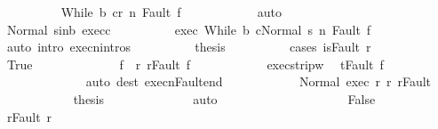 \begin{isabellebody}
\isanewline
\ \ \ \ \ \ \ \ \isamarkupfalse%
\ {\isachardoublequoteopen}{\isasymGamma}{\isasymturnstile}{\isasymlangle}While\ b\ c{\isacharcomma}r{\isacharprime}{\isasymrangle}\ {\isacharequal}n{\isasymRightarrow}\ Fault\ f{\isacharprime}{\isachardoublequoteclose}\isanewline
\ \ \ \ \ \ \ \ \ \ \isamarkupfalse%
\ auto\ \isanewline
\ \ \ \ \ \ \ \ \isamarkupfalse%
\ Normal\ s{\isacharprime}{\isacharunderscore}in{\isacharunderscore}b\ exec{\isacharunderscore}c\isanewline
\ \ \ \ \ \ \ \ \isamarkupfalse%
\ exec{\isacharcolon}\ {\isachardoublequoteopen}{\isasymGamma}{\isasymturnstile}{\isasymlangle}While\ b\ c{\isacharcomma}Normal\ s{\isacharprime}{\isasymrangle}\ {\isacharequal}n{\isasymRightarrow}\ Fault\ f{\isacharprime}{\isachardoublequoteclose}\isanewline
\ \ \ \ \ \ \ \ \ \ \isamarkupfalse%
\ {\isacharparenleft}auto\ intro{\isacharcolon}\ execn{\isachardot}intros{\isacharparenright}\isanewline
\ \ \ \ \ \ \ \ \isamarkupfalse%
\ {\isacharquery}thesis\isanewline
\ \ \ \ \ \ \ \ \isamarkupfalse%
\ {\isacharparenleft}cases\ {\isachardoublequoteopen}isFault\ r{\isachardoublequoteclose}{\isacharparenright}\isanewline
\ \ \ \ \ \ \ \ \ \ \isamarkupfalse%
\ True\isanewline
\ \ \ \ \ \ \ \ \ \ \isamarkupfalse%
\ \isamarkupfalse%
\ f\ \ r{\isacharcolon}\ {\isachardoublequoteopen}r{\isacharequal}Fault\ f{\isachardoublequoteclose}\isacommand{{\isachardot}{\isachardot}}\isamarkupfalse%
\isanewline
\ \ \ \ \ \ \ \ \ \ \isamarkupfalse%
\ exec{\isacharunderscore}strip{\isacharunderscore}w\ \isamarkupfalse%
\ {\isachardoublequoteopen}t{\isacharequal}Fault\ f{\isachardoublequoteclose}\isanewline
\ \ \ \ \ \ \ \ \ \ \ \ \isamarkupfalse%
\ {\isacharparenleft}auto\ dest{\isacharcolon}\ execn{\isacharunderscore}Fault{\isacharunderscore}end{\isacharparenright}\isanewline
\ \ \ \ \ \ \ \ \ \ \isamarkupfalse%
\ Normal\ exec\ r{\isacharprime}\ r\ r{\isacharprime}{\isacharunderscore}Fault\isanewline
\ \ \ \ \ \ \ \ \ \ \isamarkupfalse%
\ {\isacharquery}thesis\isanewline
\ \ \ \ \ \ \ \ \ \ \ \ \isamarkupfalse%
\ auto\isanewline
\ \ \ \ \ \ \ \ \isamarkupfalse%
\isanewline
\ \ \ \ \ \ \ \ \ \ \isamarkupfalse%
\ False\isanewline
\ \ \ \ \ \ \ \ \ \ \isamarkupfalse%
\ r{\isacharprime}{\isacharunderscore}Fault\ r{\isacharprime}\ \isamarkupfalse%

\end{isabellebody}
